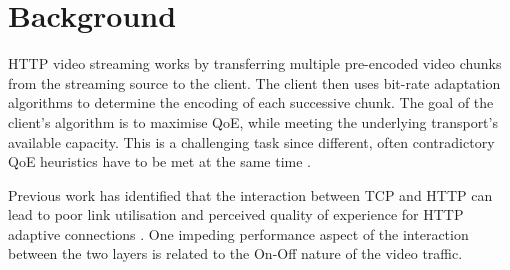 \documentclass[10pt,sigconf]{acmart}
\begin{document}

\section{Background}
\label{sec:background}


HTTP video streaming works by transferring multiple pre-encoded video chunks from the streaming source to the client. The client then uses bit-rate adaptation algorithms to determine the encoding of each successive chunk. The goal of the client's algorithm is to maximise QoE, while meeting the underlying transport's available capacity. This is a challenging task since different, often contradictory QoE heuristics have to be met at the same time \cite{Seufert-2015-A-Survey-on-QoE-Dash}. 

Previous work has identified that the interaction between TCP and HTTP can lead to poor link utilisation and perceived quality of experience for HTTP adaptive connections \cite{Bae-2015-why-is-http-streaming-hard,Esteban-2012-Interactions-HTTP-TCP}. One impeding performance aspect of the interaction between the two layers is related to the On-Off nature of the video traffic.
\end{document}
